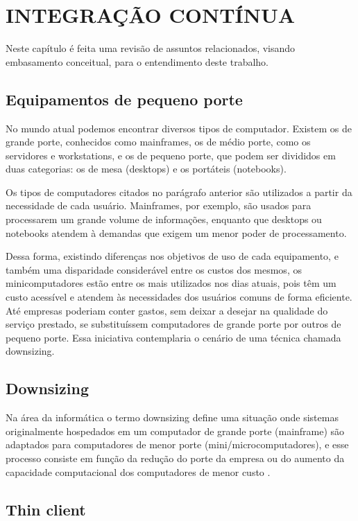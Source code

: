 \chapter{INTEGRAÇÃO CONTÍNUA}

Neste capítulo é feita uma revisão de assuntos relacionados, visando embasamento conceitual, para o entendimento deste trabalho.

\section{Equipamentos de pequeno porte}

No mundo atual podemos encontrar diversos tipos de computador. Existem os de grande porte, conhecidos como mainframes, os de médio porte, como os servidores e workstations, e os de pequeno porte, que podem ser divididos em duas categorias: os de mesa (desktops) e os portáteis (notebooks).

Os tipos de computadores citados no parágrafo anterior são utilizados a partir da necessidade de cada usuário. Mainframes, por exemplo, são usados para processarem um grande volume de informações, enquanto que desktops ou notebooks atendem à demandas que exigem um menor poder de processamento.

Dessa forma, existindo diferenças nos objetivos de uso de cada equipamento, e também uma disparidade considerável entre os custos dos mesmos, os minicomputadores estão entre os mais utilizados nos dias atuais, pois têm um custo acessível e atendem às necessidades dos usuários comuns de forma eficiente. Até empresas poderiam conter gastos, sem deixar a desejar na qualidade do serviço prestado, se substituíssem computadores de grande porte por outros de pequeno porte. Essa iniciativa contemplaria o cenário de uma técnica chamada downsizing.

\section{Downsizing}

Na área da informática o termo downsizing define uma situação onde sistemas originalmente hospedados em um computador de grande porte (mainframe) são adaptados para computadores de menor porte (mini/microcomputadores), e esse processo consiste em função da redução do porte da empresa ou do aumento da capacidade computacional dos computadores de menor custo \cite{WIKIPEDIA3}.

\section{Thin client}

